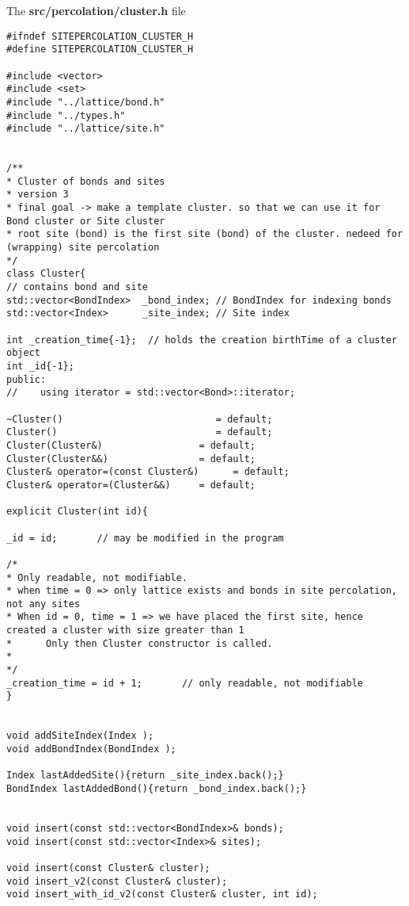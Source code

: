 
The \textbf{src/percolation/cluster.h} file

\begin{lstlisting}[style=CStyle]
#ifndef SITEPERCOLATION_CLUSTER_H
#define SITEPERCOLATION_CLUSTER_H

#include <vector>
#include <set>
#include "../lattice/bond.h"
#include "../types.h"
#include "../lattice/site.h"


/**
* Cluster of bonds and sites
* version 3
* final goal -> make a template cluster. so that we can use it for Bond cluster or Site cluster
* root site (bond) is the first site (bond) of the cluster. nedeed for (wrapping) site percolation
*/
class Cluster{
// contains bond and site
std::vector<BondIndex>  _bond_index; // BondIndex for indexing bonds
std::vector<Index>      _site_index; // Site index

int _creation_time{-1};  // holds the creation birthTime of a cluster object
int _id{-1};
public:
//    using iterator = std::vector<Bond>::iterator;

~Cluster()                           = default;
Cluster()                            = default;
Cluster(Cluster&)                 = default;
Cluster(Cluster&&)                = default;
Cluster& operator=(const Cluster&)      = default;
Cluster& operator=(Cluster&&)     = default;

explicit Cluster(int id){

_id = id;       // may be modified in the program

/*
* Only readable, not modifiable.
* when time = 0 => only lattice exists and bonds in site percolation, not any sites
* When id = 0, time = 1 => we have placed the first site, hence created a cluster with size greater than 1
*      Only then Cluster constructor is called.
*
*/
_creation_time = id + 1;       // only readable, not modifiable
}


void addSiteIndex(Index );
void addBondIndex(BondIndex );

Index lastAddedSite(){return _site_index.back();}
BondIndex lastAddedBond(){return _bond_index.back();}


void insert(const std::vector<BondIndex>& bonds);
void insert(const std::vector<Index>& sites);

void insert(const Cluster& cluster);
void insert_v2(const Cluster& cluster);
void insert_with_id_v2(const Cluster& cluster, int id);



\end{lstlisting}
